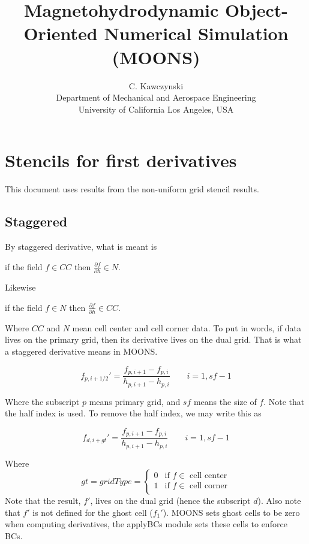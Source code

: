 \documentclass[11pt]{article}
\begin{document}
\doublespacing
\title{Magnetohydrodynamic Object-Oriented Numerical Simulation (MOONS)}
\author{C. Kawczynski \\
Department of Mechanical and Aerospace Engineering \\
University of California Los Angeles, USA\\
}
\maketitle

\section{Stencils for first derivatives}
This document uses results from the non-uniform grid stencil results.

\subsection{Staggered}
By staggered derivative, what is meant is

if the field $f\in CC$ then $\frac{\partial f}{\partial h}\in N$.  

Likewise

if the field $f\in N$ then $\frac{\partial f}{\partial h}\in CC$.  

Where $CC$ and $N$ mean cell center and cell corner data. To put in words, if data lives on the primary grid, then its derivative lives on the dual grid. That is what a staggered derivative means in MOONS.

\begin{equation}
	f_{p,i+1/2}' = \frac{f_{p,i+1}-f_{p,i}}{h_{p,i+1}-h_{p,i}} \qquad i=1,sf-1
\end{equation}

Where the subscript $p$ means primary grid, and $sf$ means the size of $f$. Note that the half index is used. To remove the half index, we may write this as

\begin{equation}
	f_{d,i+gt}' = \frac{f_{p,i+1}-f_{p,i}}{h_{p,i+1}-h_{p,i}} \qquad i=1,sf-1
\end{equation}

Where
 \begin{equation}
   gt = gridType = 
  \begin{cases} 
      0 & \text{if $f \in $ cell center} \\
      1 & \text{if $f \in $ cell corner} \\
   \end{cases}
\end{equation}
Note that the result, $f'$, lives on the dual grid (hence the subscript $d$). Also note that $f'$ is not defined for the ghost cell ($f_1'$). MOONS sets ghost cells to be zero when computing derivatives, the applyBCs module sets these cells to enforce BCs.
\end{document}
